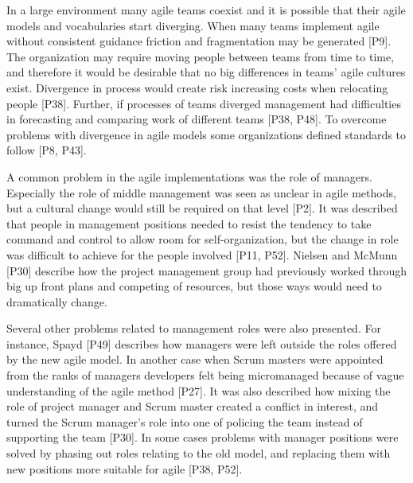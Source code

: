 \documentclass[preprint,authoryear,12pt]{elsarticle}
\begin{document}

In a large environment many agile teams coexist and it is possible that their
agile models and vocabularies start diverging. When many teams implement agile
without consistent guidance friction and fragmentation may be generated [P9].
The organization may require moving people between teams from time to time, and
therefore it would be desirable that no big differences in teams' agile cultures
exist. Divergence in process would create risk increasing costs when relocating
people [P38]. Further, if processes of teams diverged management had
difficulties in forecasting and comparing work of different teams [P38, P48].
To overcome problems with divergence in agile models some organizations defined
standards to follow [P8, P43].


A common problem in the agile implementations was the role of managers.
Especially the role of middle management was seen as unclear in agile
methods, but a cultural change would still be required on that level [P2].
It was described that people in management positions needed to resist the
tendency to take command and control to allow room for self-organization, but
the change in role was difficult to achieve for the people involved [P11, P52].
Nielsen and McMunn [P30] describe how the project management group had
previously worked through big up front plans and competing of resources, but
those ways would need to dramatically change.


Several other problems related to management roles were also presented. For
instance, Spayd [P49] describes how managers were left outside the roles offered
by the new agile model. In another case when Scrum masters were appointed from
the ranks of managers developers felt being micromanaged because of vague
understanding of the agile method [P27]. It was also described how mixing the
role of project manager and Scrum master created a conflict in interest, and
turned the Scrum manager's role into one of policing the team instead of
supporting the team [P30]. In some cases problems with manager positions were
solved by phasing out roles relating to the old model, and replacing them with
new positions more suitable for agile [P38, P52].




\end{document}
